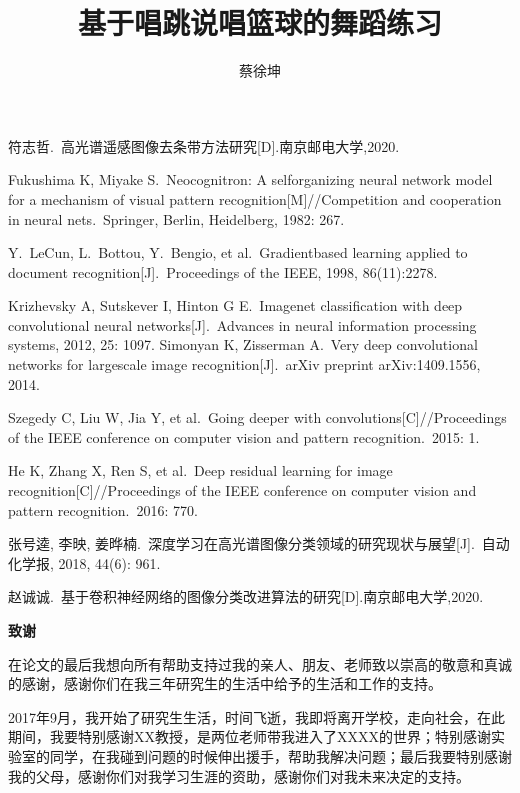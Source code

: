 \documentclass[UTF8,zihao=-4]{oucart}
\title{基于唱跳说唱篮球的舞蹈练习}
\author{蔡徐坤}
\begin{document}
    \makecover
    \makesignature
    \makeabstract

    \thispagestyle{tableofcontents}
    \tableofcontents
    \newpage

    \setcounter{page}{1}



    
    


    \begin{thebibliography}{99}
        符志哲.\ 高光谱遥感图像去条带方法研究[D].南京邮电大学,2020.

        Fukushima K, Miyake S.\ Neocognitron: A self\-organizing neural network model for a mechanism of visual pattern recognition[M]//Competition and cooperation in neural nets.\ Springer, Berlin, Heidelberg, 1982: 267.

        Y.\ LeCun, L.\ Bottou, Y.\ Bengio, et al.\ Gradient\-based learning applied to document recognition[J].\ Proceedings of the IEEE, 1998, 86(11):2278.

        Krizhevsky A, Sutskever I, Hinton G E.\ Imagenet classification with deep convolutional neural networks[J].\ Advances in neural information processing systems, 2012, 25: 1097.
        Simonyan K, Zisserman A.\ Very deep convolutional networks for large\-scale image recognition[J].\ arXiv preprint arXiv:1409.1556, 2014.

        Szegedy C, Liu W, Jia Y, et al.\ Going deeper with convolutions[C]//Proceedings of the IEEE conference on computer vision and pattern recognition.\ 2015: 1.

        He K, Zhang X, Ren S, et al.\ Deep residual learning for image recognition[C]//Proceedings of the IEEE conference on computer vision and pattern recognition.\ 2016: 770.

        张号逵, 李映, 姜晔楠.\ 深度学习在高光谱图像分类领域的研究现状与展望[J].\ 自动化学报, 2018, 44(6): 961.

        赵诚诚.\ 基于卷积神经网络的图像分类改进算法的研究[D].南京邮电大学,2020.

    \end{thebibliography}




    \newpage
    \begin{center}
         \textbf{致谢} \\
    \end{center}

    在论文的最后我想向所有帮助支持过我的亲人、朋友、老师致以崇高的敬意和真诚的感谢，感谢你们在我三年研究生的生活中给予的生活和工作的支持。

    2017年9月，我开始了研究生生活，时间飞逝，我即将离开学校，走向社会，在此期间，我要特别感谢XX教授，是两位老师带我进入了XXXX的世界；特别感谢实验室的同学，在我碰到问题的时候伸出援手，帮助我解决问题；最后我要特别感谢我的父母，感谢你们对我学习生涯的资助，感谢你们对我未来决定的支持。
\end{document}
